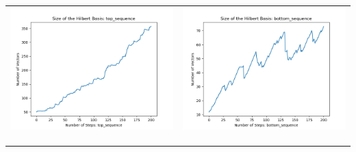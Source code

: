 \documentclass[10pt]{article}
\begin{document}
\begin{tabular}{c|c}
\begin{minipage}{.45\textwidth}
\includegraphics[width=\textwidth]{"DATA/5d/6 generators 2 bound I/top_sequence SIZE"}
\end{minipage} &
\begin{minipage}{.45\textwidth}
\includegraphics[width=\textwidth]{"DATA/5d/6 generators 2 bound I bottomup/bottom_sequence SIZE"}
\end{minipage} \\ \\
\hline \\\begin{minipage}{.45\textwidth}

\end{minipage}
\end{tabular}
\end{document}
